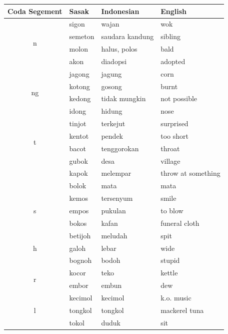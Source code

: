 \documentclass[12pt]{ouparticle}
\begin{document}
\begin{table}[]
    \centering
    \begin{tabular}{c|l l l}
    Coda Segement & Sasak & Indonesian & English  \\
    \hline
    \multirow{4}{*}{n} & sigon & wajan & wok\\
                       & semeton & saudara kandung & sibling\\
                       & molon & halus, polos & bald\\
                       & akon & diadopsi   & adopted \\
    \hline
    \multirow{4}{*}{ng} & jagong & jagung & corn\\
                       & kotong & gosong & burnt\\
                       & kedong & tidak mungkin & not possible\\
                       & idong & hidung   & nose \\
    \hline
    \multirow{4}{*}{t} & tinjot & terkejut & surprised\\
                       & kentot & pendek & too short\\
                       & bacot & tenggorokan & throat\\
    \hline
    \multirow{3}{*}{k} & gubok & desa & village\\
                       & kapok & melempar & throw at something\\
                       & bolok & mata & mata\\
    \hline
    \multirow{3}{*}{s} & kemos & tersenyum & smile\\
                       & empos & pukulan & to blow\\
                       & bokos & kafan & funeral cloth\\
    \hline
    \multirow{3}{*}{h} & betijoh & meludah & spit\\
                       & galoh & lebar & wide\\
                       & bognoh & bodoh & stupid\\
    \hline
    \multirow{2}{*}{r} & kocor & teko & kettle\\
                       & embor & embun & dew\\
    \hline
    \multirow{3}{*}{l} & kecimol & kecimol & k.o. music\\
                       & tongkol & tongkol & mackerel tuna\\
                       & tokol & duduk & sit\\

\end{tabular}
\end{table}
\end{document}
